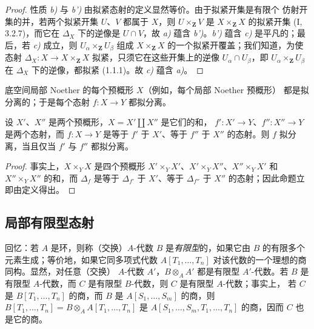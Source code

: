 \begin{proof}
性质 \emph{b)} 与 \emph{b')} 由拟紧态射的定义显然等价。由于拟紧开集是有限个
仿射开集的并，若两个拟紧开集 $U$、$V$ 都属于 $X$，则
$U\times_{\mathbf Z}V$ 是 $X\times_{\mathbf Z}X$ 的拟紧开集
(I, 3.2.7)，而它在 $\Delta_X$ 下的逆像是 $U\cap V$，故 \emph{a)}
蕴含 \emph{b')}。\emph{b')} 蕴含 \emph{c)} 是平凡的；最后，若
\emph{c)} 成立，则 $U_\alpha\times_{\mathbf Z}U_\beta$ 组成
$X\times_{\mathbf Z}X$ 的一个拟紧开覆盖；我们知道，为使态射
$\Delta_X:X\to X\times_{\mathbf Z}X$ 拟紧，只须它在这些开集上的逆像
$U_\alpha\cap U_\beta$，即 $U_\alpha\times_{\mathbf Z}U_\beta$ 在
$\Delta_X$ 下的逆像，都拟紧 (1.1.1)。故 \emph{c)} 蕴含 \emph{a)}。
\end{proof}

\begin{corollary}[1.2.8]
\label{IV.1.2.8-fr}
底空间局部 Noether 的每个预概形 $X$（例如，每个局部 Noether 预概形）
都是拟分离的；于是每个态射 $f:X\to Y$ 都拟分离。
\end{corollary}

\begin{proposition}[1.2.9]
\label{IV.1.2.9-fr}
设 $X'$、$X''$ 是两个预概形，$X=X'\coprod X''$ 是它们的和，
$f':X'\to Y$、$f'':X''\to Y$ 是两个态射，而 $f:X\to Y$ 是等于
$f'$ 于 $X'$、等于 $f''$ 于 $X''$ 的态射。则 $f$ 拟分离，当且仅当
$f'$ 与 $f''$ 都拟分离。
\end{proposition}

\begin{proof}
事实上，$X\times_YX$ 是四个预概形
$X'\times_YX'$、$X'\times_YX''$、$X''\times_YX'$ 和 $X''\times_YX''$
的和，而 $\Delta_f$ 是等于 $\Delta_{f'}$ 于 $X'$、等于
$\Delta_{f''}$ 于 $X''$ 的态射；因此命题立即由定义得出。
\end{proof}

\subsection{局部有限型态射}
\label{subsection:IV.1.3-fr}

\begin{env}[1.3.1]
\label{IV.1.3.1-fr}
回忆：若 $A$ 是环，则称（交换）$A$-代数 $B$ 是\emph{有限型}的，如果它由
$B$ 的有限多个元素生成；等价地，如果它同多项式代数
$A[T_1,\ldots,T_n]$ 对该代数的一个理想的商同构。显然，对任意（交换）
$A$-代数 $A'$，$B\otimes_AA'$ 都是有限型 $A'$-代数。若 $B$ 是有限型
$A$-代数，而 $C$ 是有限型 $B$-代数，则 $C$ 是有限型 $A$-代数；事实上，
若 $C$ 是 $B[T_1,\ldots,T_n]$ 的商，而 $B$ 是
$A[S_1,\ldots,S_m]$ 的商，则
$B[T_1,\ldots,T_n]=B\otimes_AA[T_1,\ldots,T_n]$ 是
$A[S_1,\ldots,S_m,T_1,\ldots,T_n]$ 的商，因而 $C$ 也是它的商。
\end{env}

